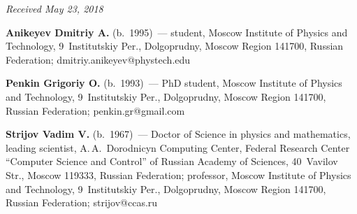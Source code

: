 \vspace*{-6pt}

\hfill{\small\textit{Received May 23, 2018}}




\Contr

\noindent
\textbf{Anikeyev Dmitriy A.} (b.\ 1995)~--- 
student, Moscow Institute of Physics and Technology, 
9~Institutskiy Per., Dolgoprudny, Moscow Region 141700, Russian Federation; 
\mbox{dmitriy.anikeyev@phystech.edu}

\vspace*{3pt}

\noindent
\textbf{Penkin Grigoriy O.} (b.\ 1993)~--- 
PhD student, Moscow Institute of Physics and Technology, 
9~Institutskiy Per., Dolgoprudny, Moscow Region 141700, Russian Federation; 
\mbox{penkin.gr@gmail.com}

\vspace*{3pt}

\noindent
\textbf{Strijov Vadim V.} (b.\ 1967)~--- 
Doctor of Science in physics and mathematics, leading scientist, 
A.\,A.~Dorodnicyn Computing Center, Federal Research Center ``Computer Science and Control'' 
of Russian Academy of Sciences, 40~Vavilov Str., Moscow 119333, Russian Federation;
professor,  Moscow Institute of Physics and Technology, 
9~Institutskiy Per., Dolgoprudny, Moscow Region 141700, Russian Federation;
\mbox{strijov@ccas.ru}
\label{end\stat}

\renewcommand{\bibname}{\protect\rm Литература}  